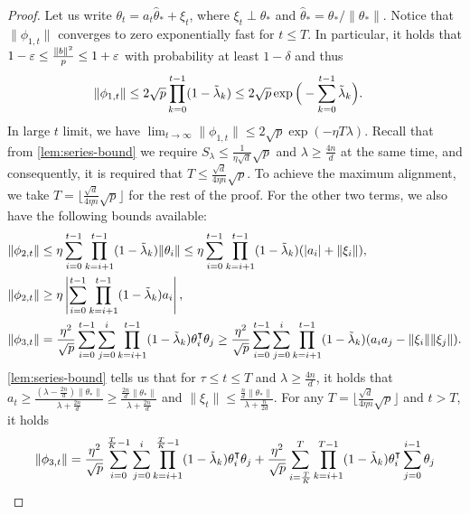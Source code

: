 \begin{proof}
    Let us write $\theta_t = a_t \hat\theta_\ast + \xi_t$, where $\xi_t\perp\theta_\ast$ and $\hat\theta_* = \theta_*/\|\theta_*\|$. Notice that $\|\phi_{1,t}\|$ converges to zero exponentially fast for $t\leq T$. In particular, it holds that $1-\varepsilon \leq \frac{\|b\|^2}{p} \leq 1+\varepsilon$ with probability at least $1-\delta$ and thus
    \begin{align*}
        \|\phi_{1,t}\| & \leq 2\sqrt p \prod_{k=0}^{t-1}(1-\tilde{\lambda}_k) \leq 2\sqrt p \exp\Big(-\sum_{k=0}^{t-1}\tilde{\lambda}_k\Big).
    \end{align*} 
    In large $t$ limit, we have $\lim_{t\to\infty}\|\phi_{1,t}\| \leq 2\sqrt p \exp(-\eta T\lambda)$. Recall that from \cref{lem:series-bound} we require $S_\lambda\leq \frac{1}{\eta\sqrt{d}}\sqrt{p}$ and $\lambda\geq \frac{4n}{d}$ at the same time, and consequently, it is required that $T\leq \frac{\sqrt{d}}{4\eta n}\sqrt{p}$. To achieve the maximum alignment, we take $T=\lfloor \frac{\sqrt{d}}{4\eta n}\sqrt{p} \rfloor$ for the rest of the proof.
    For the other two terms, we also have the following bounds available:
    \begin{align*}
        \|\phi_{2,t}\| &\leq \eta\sum_{i=0}^{t-1}\prod_{k=i+1}^{t-1}(1-\tlam_k)\|\theta_i\| 
        \leq \eta\sum_{i=0}^{t-1}\prod_{k=i+1}^{t-1}(1-\tlam_k)(|a_i|+\|\xi_i\|), \\
        \|\phi_{2,t}\| &\geq \eta\left|\sum_{i=0}^{t-1}\prod_{k=i+1}^{t-1}(1-\tlam_k)a_i\right|, \\
        \|\phi_{3,t}\| &= \frac{\eta^2}{\sqrt p}\sum_{i=0}^{t-1}\sum_{j=0}^i\prod_{k=i+1}^{t-1}(1-\tlam_k)\theta_i\transpose \theta_j \geq \frac{\eta^2}{\sqrt p}\sum_{i=0}^{t-1}\sum_{j=0}^i\prod_{k=i+1}^{t-1}(1-\tlam_k)(a_ia_j-\|\xi_i\|\|\xi_j\|).
    \end{align*}
    \cref{lem:series-bound} tells us that for $\tau \leq t \leq T$ and $\lambda \geq \frac{4n}{d}$, it holds that $a_t\geq \frac{(\lambda - \frac{2n}{d})\|\theta_*\|}{\lambda + \frac{2n}{d}} \geq \frac{\frac{2n}{d}\|\theta_*\|}{\lambda + \frac{2n}{d}}$ and $\|\xi_t\|\leq \frac{\frac{n}{d}\|\theta_*\|}{\lambda + \frac{n}{2d}}$.
    For any $T = \lfloor \frac{\sqrt{d}}{4\eta n}\sqrt{p} \rfloor$ and $t>T$, it holds
    \begin{align*}
        \|\phi_{3,t}\| 
        & = \frac{\eta^2}{\sqrt p}\sum_{i=0}^{\frac{T}{K}-1}\sum_{j=0}^i\prod_{k=i+1}^{\frac{T}{K}-1}(1-\tlam_k)\theta_i\transpose\theta_j + \frac{\eta^2}{\sqrt p}\sum_{i=\frac{T}{K}}^{T}\prod_{k=i+1}^{T-1}(1-\tlam_k)\theta_i\transpose\sum_{j=0}^{i-1} \theta_j \\

\end{align*}
\end{proof}
